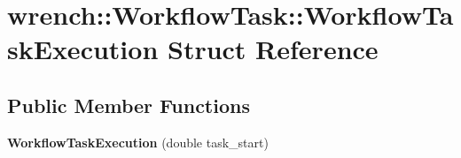 \hypertarget{structwrench_1_1_workflow_task_1_1_workflow_task_execution}{}\section{wrench\+:\+:Workflow\+Task\+:\+:Workflow\+Task\+Execution Struct Reference}
\label{structwrench_1_1_workflow_task_1_1_workflow_task_execution}
\subsection*{Public Member Functions}
\begin{DoxyCompactItemize}
\item 
\mbox{\label{structwrench_1_1_workflow_task_1_1_workflow_task_execution_a4c2fbd22157f771e925e28cf89874b93}} 
{\bfseries Workflow\+Task\+Execution} (double task\+\_\+start)
\end{DoxyCompactItemize}
